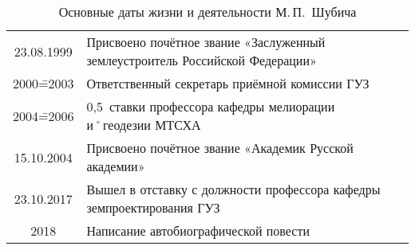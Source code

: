\begin{table}[t]
{\begin{tabularx}{\textwidth}{cX}
		23.08.1999	&	Присвоено почётное звание «Заслуженный землеустроитель Российской Федерации»		\\
		2000\==2003		&	Ответственный секретарь приёмной комиссии ГУЗ										\\
		2004\==2006		&	0,5~ставки профессора кафедры мелиорации и˚геодезии МТСХА							\\
		15.10.2004	&	Присвоено почётное звание «Академик Русской академии»									\\
		23.10.2017	&	Вышел в отставку с должности профессора кафедры земпроектирования ГУЗ									\\
		2018				&	Написание автобиографической повести									\\
	\end{tabularx}
}
\caption{Основные даты жизни и деятельности М.\,П.~Шубича}
\label{tab:biograf}  
\end{table}

\FloatBarrier